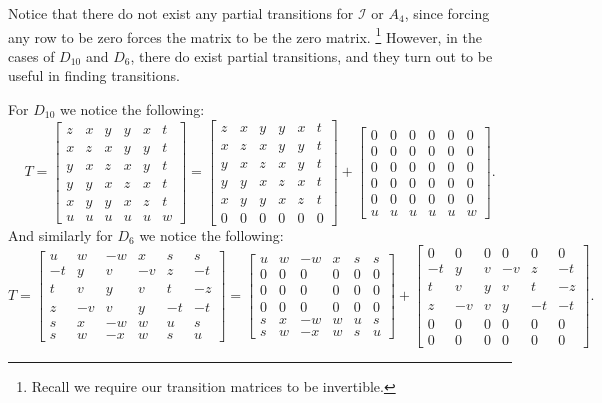 \documentclass[a4paper,10pt]{article}
\let\oldfootnote\footnote
\renewcommand{\footnote}{\unskip\oldfootnote}
\theoremstyle{plain}
\theoremstyle{definition}
\theoremstyle{remark}
\begin{document}
Notice that there do not exist any partial transitions for \(\mathcal{I}\) or \(A_4\), since forcing any row to be zero forces the matrix to be the zero matrix.
\footnote{Recall we require our transition matrices to be invertible.}
However, in the cases of \(D_{10}\) and \(D_6\), there do exist partial transitions, and they turn out to be useful in finding transitions.

\noindent For \(D_{10}\) we notice the following:
\[T = \begin{bmatrix}
	z & x & y & y & x & t \\
	x & z & x & y & y & t \\
	y & x & z & x & y & t \\
	y & y & x & z & x & t \\
	x & y & y & x & z & t \\
	u & u & u & u & u & w
\end{bmatrix} = \begin{bmatrix}
	z & x & y & y & x & t \\
	x & z & x & y & y & t \\
	y & x & z & x & y & t \\
	y & y & x & z & x & t \\
	x & y & y & x & z & t \\
	0 & 0 & 0 & 0 & 0 & 0
\end{bmatrix} + \begin{bmatrix}
	0 & 0 & 0 & 0 & 0 & 0 \\
	0 & 0 & 0 & 0 & 0 & 0 \\
	0 & 0 & 0 & 0 & 0 & 0 \\
	0 & 0 & 0 & 0 & 0 & 0 \\
	0 & 0 & 0 & 0 & 0 & 0 \\
	u & u & u & u & u & w
\end{bmatrix}.\]
And similarly for \(D_6\) we notice the following:
\[T = \begin{bmatrix}
	u  & w  & -w & x  & s  & s  \\
	-t & y  & v  & -v & z  & -t \\
	t  & v  & y  & v  & t  & -z \\
	z  & -v & v  & y  & -t & -t \\
	s  & x  & -w & w  & u  & s  \\
	s  & w  & -x & w  & s  & u
\end{bmatrix} = \begin{bmatrix}
	u  & w  & -w & x  & s  & s  \\
	0 & 0 & 0 & 0 & 0 & 0 \\
	0 & 0 & 0 & 0 & 0 & 0 \\
	0 & 0 & 0 & 0 & 0 & 0 \\
	s  & x  & -w & w  & u  & s  \\
	s  & w  & -x & w  & s  & u
\end{bmatrix} + \begin{bmatrix}
	0 & 0 & 0 & 0 & 0 & 0 \\
	-t & y  & v  & -v & z  & -t \\
	t  & v  & y  & v  & t  & -z \\
	z  & -v & v  & y  & -t & -t \\
	0 & 0 & 0 & 0 & 0 & 0 \\
	0 & 0 & 0 & 0 & 0 & 0
\end{bmatrix}.\]
\end{document}
